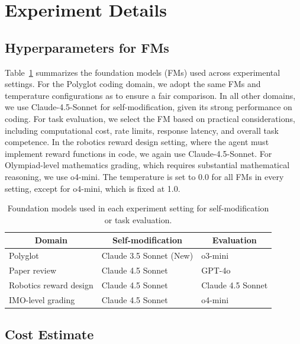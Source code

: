 \section{Experiment Details}
\label{app:exp-details}

\subsection{Hyperparameters for FMs}
\label{app:fm-hyperparam}

Table~\ref{tab:fm-hyperparam} summarizes the foundation models (FMs) used across experimental settings. For the Polyglot coding domain, we adopt the same FMs and temperature configurations as \citet{zhang2025darwin} to ensure a fair comparison. In all other domains, we use Claude-4.5-Sonnet for self-modification, given its strong performance on coding. For task evaluation, we select the FM based on practical considerations, including computational cost, rate limits, response latency, and overall task competence. In the robotics reward design setting, where the agent must implement reward functions in code, we again use Claude-4.5-Sonnet. For Olympiad-level mathematics grading, which requires substantial mathematical reasoning, we use o4-mini. The temperature is set to 0.0 for all FMs in every setting, except for o4-mini, which is fixed at 1.0.

\begin{table}[H]
\centering
\caption[Foundation models used in each experiment setting]{Foundation models used in each experiment setting for self-modification or task evaluation.}
\label{tab:fm-hyperparam}
\begin{tabular}{@{}lll@{}}
\toprule
\multicolumn{1}{c}{\textbf{Domain}} & \multicolumn{1}{c}{\textbf{Self-modification}} & \multicolumn{1}{c}{\textbf{Evaluation}} \\ \midrule
Polyglot & Claude 3.5 Sonnet (New) & o3-mini \\
Paper review & Claude 4.5 Sonnet & GPT-4o \\
Robotics reward design & Claude 4.5 Sonnet & Claude 4.5 Sonnet \\
IMO-level grading & Claude 4.5 Sonnet & o4-mini \\ \bottomrule
\end{tabular}
\end{table}

\subsection{Cost Estimate}
\label{app:cost-estimate}

